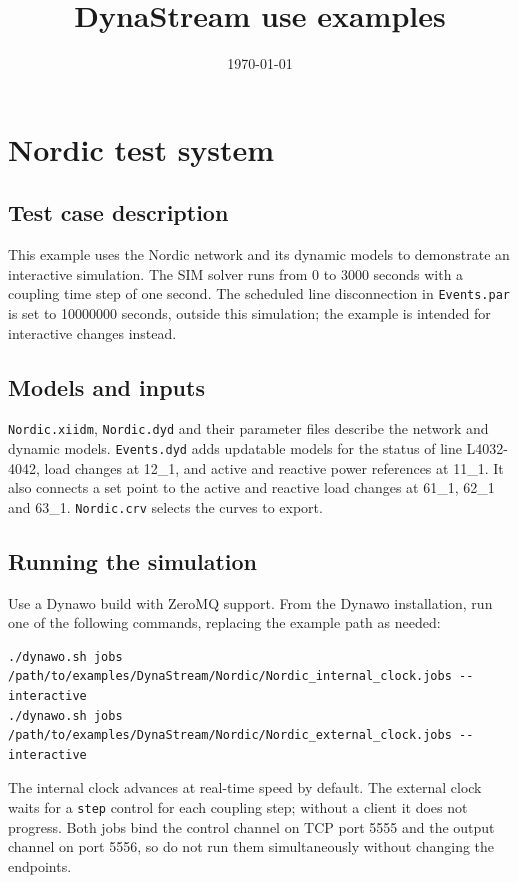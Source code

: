 \documentclass[a4paper, 12pt]{report}
\begin{document}
\title{DynaStream use examples}
\date\today
\maketitle
\tableofcontents

\chapter{Nordic test system}
\section{Test case description}
This example uses the Nordic network and its dynamic models to demonstrate an interactive simulation. The SIM solver runs from 0 to 3000 seconds with a coupling time step of one second. The scheduled line disconnection in \texttt{Events.par} is set to 10000000 seconds, outside this simulation; the example is intended for interactive changes instead.

\section{Models and inputs}
\texttt{Nordic.xiidm}, \texttt{Nordic.dyd} and their parameter files describe the network and dynamic models. \texttt{Events.dyd} adds updatable models for the status of line L4032-4042, load changes at 12\_1, and active and reactive power references at 11\_1. It also connects a set point to the active and reactive load changes at 61\_1, 62\_1 and 63\_1. \texttt{Nordic.crv} selects the curves to export.

\section{Running the simulation}
Use a Dynawo build with ZeroMQ support. From the Dynawo installation, run one of the following commands, replacing the example path as needed:
\begin{verbatim}
./dynawo.sh jobs /path/to/examples/DynaStream/Nordic/Nordic_internal_clock.jobs --interactive
./dynawo.sh jobs /path/to/examples/DynaStream/Nordic/Nordic_external_clock.jobs --interactive
\end{verbatim}
The internal clock advances at real-time speed by default. The external clock waits for a \texttt{step} control for each coupling step; without a client it does not progress. Both jobs bind the control channel on TCP port 5555 and the output channel on port 5556, so do not run them simultaneously without changing the endpoints.
\end{document}
